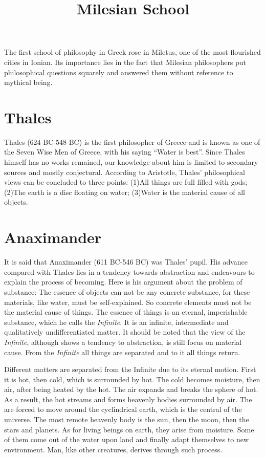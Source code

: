 \documentclass[11pt]{article}
\title{Milesian School}
\date{}
\begin{document}
  \maketitle

  \linenumbers
  
The first school of philosophy in Greek rose in Miletus, one of the most flourished cities in Ionian. 
Its importance lies in the fact that Milesian philosophers put philosophical questions squarely and answered them without reference to mythical being.

\section{Thales}
Thales (624 BC-548 BC) is the first philosopher of Greece and is known as one of the Seven Wise Men of Greece, with his saying “Water is best”. 
Since Thales himself has no works remained, our knowledge about him is limited to secondary sources and mostly conjectural. 
According to Aristotle, Thales’ philosophical views can be concluded to three points: 
(1)All things are full filled with gods; 
(2)The earth is a disc floating on water; 
(3)Water is the material cause of all objects.
  
\section{Anaximander}
It is said that Anaximander (611 BC-546 BC) was Thales’ pupil. 
His advance compared with Thales lies in a tendency towards abstraction and endeavours to explain the process of becoming. 
Here is his argument about the problem of substance: 
The essence of objects can not be any concrete substance, for these materials, like water, must be self-explained. 
So concrete elements must not be the material cause of things. 
The essence of things is an eternal, imperishable substance, which he calls the \textit{Infinite}. 
It is an infinite, intermediate and qualitatively undifferentiated matter. 
It should be noted that the view of the \textit{Infinite}, although shows a tendency to abstraction, is still focus on material cause. 
From the \textit{Infinite} all things are separated and to it all things return.

\newline

Different matters are separated from the Infinite due to its eternal motion. 
First it is hot, then cold, which is surrounded by hot. 
The cold becomes moisture, then air, after being heated by the hot. 
The air expands and breaks the sphere of hot. 
As a result, the hot streams and forms heavenly bodies surrounded by air. 
The are forced to move around the cyclindrical earth, which is the central of the universe. 
The most remote heavenly body is the sun, then the moon, then the stars and planets. 
As for living beings on earth, they arise from moisture. 
Some of them come out of the water upon land and finally adapt themselves to new environment. 
Man, like other creatures, derives through such process.
\end{document}
